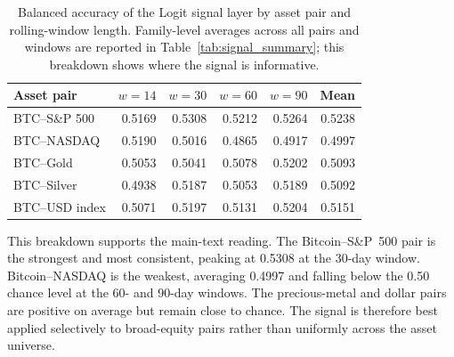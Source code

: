 \begin{table}[H]
    \centering
    \caption{Balanced accuracy of the Logit signal layer by asset pair and rolling-window
             length. Family-level averages across all pairs and windows are reported in
             Table~\ref{tab:signal_summary}; this breakdown shows where the signal is
             informative.}
    \label{tab:app_signal_summary}
    \begin{tabular}{lrrrrr}
        \toprule
        Asset pair & $w{=}14$ & $w{=}30$ & $w{=}60$ & $w{=}90$ & Mean \\
        \midrule
        BTC--S\&P 500  & 0.5169 & 0.5308 & 0.5212 & 0.5264 & 0.5238 \\
        BTC--NASDAQ    & 0.5190 & 0.5016 & 0.4865 & 0.4917 & 0.4997 \\
        BTC--Gold      & 0.5053 & 0.5041 & 0.5078 & 0.5202 & 0.5093 \\
        BTC--Silver    & 0.4938 & 0.5187 & 0.5053 & 0.5189 & 0.5092 \\
        BTC--USD index & 0.5071 & 0.5197 & 0.5131 & 0.5204 & 0.5151 \\
        \bottomrule
    \end{tabular}
\end{table}

This breakdown supports the main-text reading. The Bitcoin--S\&P~500 pair is the
strongest and most consistent, peaking at 0.5308 at the 30-day window. Bitcoin--NASDAQ
is the weakest, averaging 0.4997 and falling below the 0.50 chance level at the 60- and
90-day windows. The precious-metal and dollar pairs are positive on average but remain
close to chance. The signal is therefore best applied selectively to broad-equity pairs
rather than uniformly across the asset universe.
